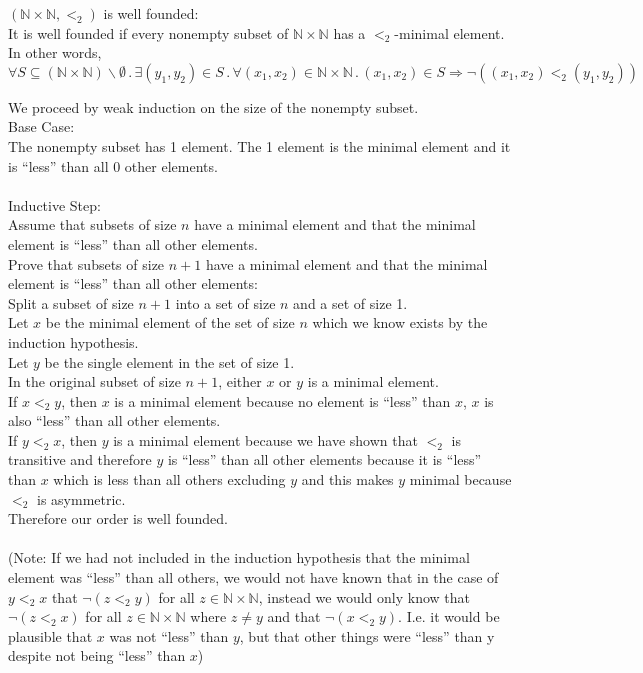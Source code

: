 \documentclass[11pt,fleqn]{article}
\newcommand{\mdot}{\mathrel.}
\begin{document}
	\item $(\mathbb{N} \times \mathbb{N}, <_2)$ is well founded: \\
		It is well founded if every nonempty subset of $\mathbb{N} \times \mathbb{N}$ has a $<_2$-minimal element.
		In other words,
		\[\forall S \subseteq (\mathbb{N} \times \mathbb{N}) \backslash \emptyset \mdot \exists (y_1,y_2) \in S \mdot \forall (x_1,x_2) \in \mathbb{N} \times \mathbb{N} \mdot (x_1,x_2) \in S \Rightarrow \neg{}((x_1,x_2) <_2 (y_1,y_2))\]
		
		We proceed by weak induction on the size of the nonempty subset.\\
		Base Case: \\
		The nonempty subset has 1 element. The 1 element is the minimal element and it is ``less'' than all 0 other elements.\\\\
		Inductive Step: \\
		Assume that subsets of size $n$ have a minimal element and that the minimal element is ``less'' than all other elements. \\
		Prove that subsets of size $n+1$ have a minimal element and that the minimal element is ``less'' than all other elements: \\
		Split a subset of size $n+1$ into a set of size $n$ and a set of size 1. \\
		Let $x$ be the minimal element of the set of size $n$ which we know exists by the induction hypothesis. \\
		Let $y$ be the single element in the set of size 1. \\
		In the original subset of size $n+1$, either $x$ or $y$ is a minimal element. \\
		If $x <_2 y$, then $x$ is a minimal element because no element is ``less'' than $x$, $x$ is also ``less'' than all other elements. \\
		If $y <_2 x$, then $y$ is a minimal element because we have shown that $<_2$ is transitive and therefore $y$ is ``less'' than all other elements because it is ``less'' than $x$ which is less than all others excluding $y$ and this makes $y$ minimal because $<_2$ is asymmetric.\\
		Therefore our order is well founded.
		\\\\
		(Note: If we had not included in the induction hypothesis that the minimal element was ``less'' than all others, we would not have known that in the case of $y <_2 x$ that $\neg{}(z <_2 y)$ for all $z \in \mathbb{N} \times \mathbb{N}$, instead we would only know that $\neg{}(z <_2 x)$ for all $z \in \mathbb{N} \times \mathbb{N}$ where $z \neq y$ and that $\neg{}(x <_2 y)$. I.e. it would be plausible that $x$ was not ``less'' than $y$, but that other things were ``less'' than y despite not being ``less'' than $x$)
	
\end{document}
